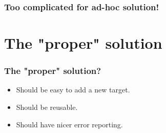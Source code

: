 \documentclass[handout]{beamer}
\begin{document}

\begin{frame}

\frametitle{Too complicated for ad-hoc solution!}

\begin{center}
\end{center}

\end{frame}


\section{The "proper" solution}


\begin{frame}

\frametitle{The "proper" solution?}

\begin{itemize}
\item Should be easy to add a new target.
\item Should be reusable.
\item Should have nicer error reporting.
\end{itemize}

\end{frame}
\end{document}
